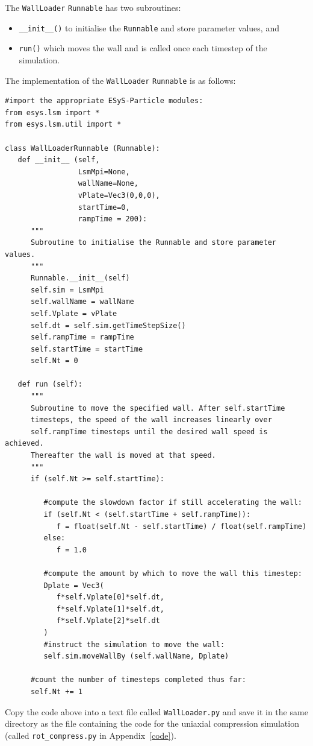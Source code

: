 The \texttt{WallLoader} \texttt{Runnable} has two subroutines:
\begin{itemize} 
\item \texttt{\_\_init\_\_()} to initialise the \texttt{Runnable} and store parameter values, and
\item \texttt{run()} which moves the wall and is called once each timestep of the simulation.
\end{itemize} 

\noindent
The implementation of the \texttt{WallLoader} \texttt{Runnable} is as follows:

\begin{verbatim}
#import the appropriate ESyS-Particle modules:
from esys.lsm import *
from esys.lsm.util import *

class WallLoaderRunnable (Runnable):
   def __init__ (self, 
                 LsmMpi=None, 
                 wallName=None, 
                 vPlate=Vec3(0,0,0), 
                 startTime=0, 
                 rampTime = 200):
      """
      Subroutine to initialise the Runnable and store parameter values.
      """
      Runnable.__init__(self)
      self.sim = LsmMpi
      self.wallName = wallName
      self.Vplate = vPlate
      self.dt = self.sim.getTimeStepSize()
      self.rampTime = rampTime
      self.startTime = startTime
      self.Nt = 0

   def run (self):
      """
      Subroutine to move the specified wall. After self.startTime 
      timesteps, the speed of the wall increases linearly over 
      self.rampTime timesteps until the desired wall speed is achieved. 
      Thereafter the wall is moved at that speed.
      """
      if (self.Nt >= self.startTime):

         #compute the slowdown factor if still accelerating the wall:
         if (self.Nt < (self.startTime + self.rampTime)):
            f = float(self.Nt - self.startTime) / float(self.rampTime)
         else:
            f = 1.0

         #compute the amount by which to move the wall this timestep:
         Dplate = Vec3(
            f*self.Vplate[0]*self.dt, 
            f*self.Vplate[1]*self.dt, 
            f*self.Vplate[2]*self.dt
         )
         #instruct the simulation to move the wall:
         self.sim.moveWallBy (self.wallName, Dplate)

      #count the number of timesteps completed thus far:
      self.Nt += 1
\end{verbatim}

\noindent
Copy the code above into a text file called \texttt{WallLoader.py} and save it in the same directory as the file containing the code for the uniaxial compression simulation (called \texttt{rot\_compress.py} in Appendix~\ref{code}).


